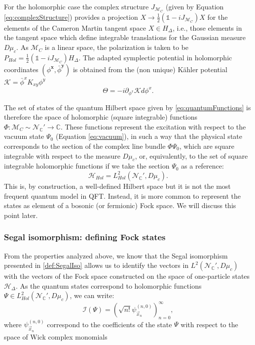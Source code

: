 \documentclass[12pt]{article}%
\begin{document}
For the holomorphic case the complex structure $J_{\mathcal{M}_C}$ (given by Equation \eqref{eq:complexStructure}) provides a projection $X\to \frac12(\mathds{1}-iJ_{\mathcal{M}_C})X$ for the elements of the Cameron Martin tangent space $X\in H_{\Delta}$, i.e., those elements in the tangent space which define integrable translations for the Gaussian measure $D\mu_c$. As $\mathcal{M}_C$ is a linear space,  the polarization is taken to be $P_{Hol}=\frac12(\mathds{1}-iJ_{\mathcal{M}_C}) H_{\Delta}$. The adapted symplectic potential in holomorphic coordinates $(\phi^{\mathbf{x}},\bar{\phi}^{\mathbf{y}})$ is obtained from the (non unique) Kähler potential $\mathcal{K}=\bar{\phi}^xK_{xy}{\phi}^y$ 
\begin{equation}
\label{eq:SymplecticPotential}
\Theta=-{i}\partial_{\phi^x} \mathcal{K}d\phi^x.
\end{equation}

The set of states of the quantum Hilbert space given by \eqref{eq:quantumFunctions} is therefore the space of holomorphic (square integrable) functions $\Phi:\mathcal{M}_C\sim \mathcal{N}_{\mathbb{C}}'\to \mathbb{C}$. These functions represent the excitation with respect to the vacuum state $\Psi_0$ (Equation \ref{eq:vacuum}), in such a way that the physical state corresponds to the section of the complex line bundle $\Phi\Psi_0$, which are square integrable with respect to the measure $D\mu_c$, or, equivalently, to the set of square integrable holomorphic functions if we take the section $\Psi_0$ as a reference:
\begin{equation}
    \label{eq:states_holomorphic}
    \mathcal{H}_{Hol}=L^2_{Hol}(\mathcal{N}_{\mathbb{C}}', D\mu_c).
    \end{equation}
This is, by construction, a well-defined Hilbert space but it is not the most frequent quantum model in QFT. Instead, it is more common to represent the states as element of a bosonic (or fermionic) Fock space.  We will discuss this point later.

\subsubsection{Segal isomorphism: defining Fock states}

From the properties analyzed above, we know that the Segal isomorphism presented in \autoref{def:SegalIso} allows us to identify the vectors in $L^2(\mathcal{N}_{\mathbb{C}}', D\mu_c)$ with the vectors of the Fock space constructed on the space of one-particle states $\mathcal{H}_\Delta$. As the quantum states correspond to holomorphic functions $\Psi\in L_{Hol}^2(\mathcal{N}_{\mathbb{C}}', D\mu_c)$, we can write:
\begin{equation}
\label{eq:Segal_holo}
\mathcal{I}(\Psi)=\left (\sqrt{n!}\psi^{(n,0)}_{\vec x_n} \right )_{n=0}^\infty, 
\end{equation}
where $\psi^{(n,0)}_{\vec x_n } $ correspond to the coefficients of the state $\Psi$ with respect to the space of Wick complex monomials
\end{document}
